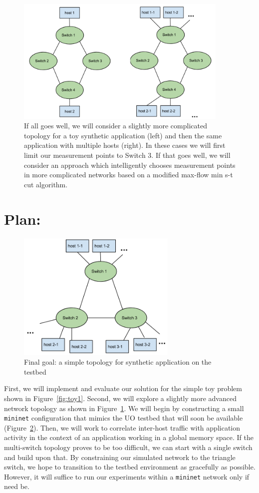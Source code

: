 \documentclass[12pt]{article}
\begin{document}
\begin{figure}[t]
\centerline{\includegraphics[width=4.0in]{img/topo_comp.png}}
\caption{If all goes well, we will consider a slightly more complicated topology for a toy synthetic application (left) and then the  same application with multiple hosts (right). In these cases we will first limit our measurement points
to Switch 3.  If that goes well, we will consider an approach which intelligently chooses
measurement points in more complicated networks based on a modified max-flow min s-t cut algorithm.}
\label{fig:topo_comp}
\end{figure}


\section*{Plan:}
\label{plan}
\begin{figure}[t]
\centerline{\includegraphics[width=3.0in]{img/topo.png}}
\caption{Final goal: a simple topology for synthetic application on the testbed}
\label{fig:topo}
\end{figure}
First, we will implement and evaluate our solution for the simple toy problem shown in 
Figure~\ref{fig:toy1}.  Second, we will explore a slightly more advanced network topology 
as shown in Figure~\ref{fig:topo_comp}.  We will begin by constructing a small \texttt{mininet} configuration that mimics the UO testbed
that will soon be available (Figure~\ref{fig:topo}).  Then, we will work to correlate
inter-host traffic with application activity in the context of an application working in 
a global memory space.  If the multi-switch topology proves to be too difficult, we can 
start with a single switch and build upon that.  By constraining our simulated network to the
triangle switch, we hope to transition to the testbed environment as gracefully as possible.  However,
it will suffice to run our experiments within a \texttt{mininet} network only if need be.
\end{document}
